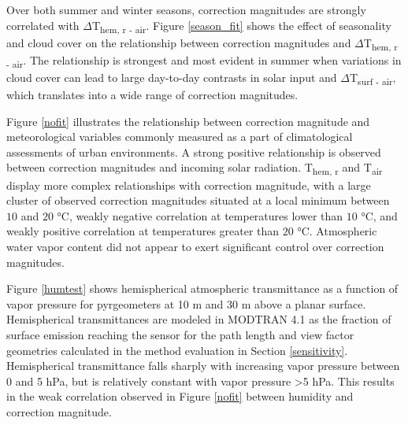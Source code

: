 \begin{bibunit}
Over both summer and winter seasons, correction magnitudes are strongly correlated with $\Delta$T\textsubscript{hem, r - air}. Figure \ref{season_fit} shows the effect of seasonality and cloud cover on the relationship between correction magnitudes and $\Delta$T\textsubscript{hem, r - air}. The relationship is strongest and most evident in summer when variations in cloud cover can lead to large day-to-day contrasts in solar input and $\Delta$T\textsubscript{surf - air}, which translates into a wide range of correction magnitudes.

Figure \ref{nofit} illustrates the relationship between correction magnitude and meteorological variables commonly measured as a part of climatological assessments of urban environments. A strong positive relationship is observed between correction magnitudes and incoming solar radiation. T\textsubscript{hem, r} and T\textsubscript{air} display more complex relationships with correction magnitude, with a large cluster of observed correction magnitudes situated at a local minimum between $10$ and $20$ \si{\degreeCelsius}, weakly negative correlation at temperatures lower than $10$ \si{\degreeCelsius}, and weakly positive correlation at temperatures greater than $20$ \si{\degreeCelsius}. Atmospheric water vapor content did not appear to exert significant control over correction magnitudes.

Figure \ref{humtest} shows hemispherical atmospheric transmittance as a function of vapor pressure for pyrgeometers at 10 \si{\meter} and 30 \si{\meter} above a planar surface. Hemispherical transmittances are modeled in MODTRAN 4.1 as the fraction of surface emission reaching the sensor for the path length and view factor geometries calculated in the method evaluation in Section \ref{sensitivity}. Hemispherical transmittance falls sharply with increasing vapor pressure between 0 and 5 \si{\hecto\pascal}, but is relatively constant with vapor pressure \textgreater 5 \si{\hecto\pascal}. This results in the weak correlation observed in Figure \ref{nofit} between humidity and correction magnitude.



\end{bibunit}
